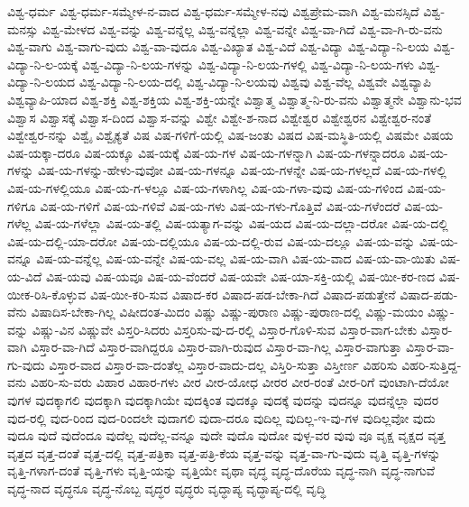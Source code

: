 {ವಿಶ್ವ-ಧರ್ಮ
ವಿಶ್ವ-ಧರ್ಮ-ಸಮ್ಮೇಳ-ನ-ವಾದ
ವಿಶ್ವ-ಧರ್ಮ-ಸಮ್ಮೇಳ-ನವು
ವಿಶ್ವಪ್ರೇಮ-ವಾಗಿ
ವಿಶ್ವ-ಮನಸ್ಸಿದೆ
ವಿಶ್ವ-ಮನಸ್ಸು
ವಿಶ್ವ-ಮೇಳದ
ವಿಶ್ವ-ವನ್ನು
ವಿಶ್ವ-ವನ್ನೆಲ್ಲ
ವಿಶ್ವ-ವನ್ನೆಲ್ಲಾ
ವಿಶ್ವ-ವನ್ನೇ
ವಿಶ್ವ-ವಾ-ಗಿದೆ
ವಿಶ್ವ-ವಾ-ಗಿ-ರು-ವನು
ವಿಶ್ವ-ವಾಗು
ವಿಶ್ವ-ವಾಗು-ವುದು
ವಿಶ್ವ-ವಾ-ವುದೂ
ವಿಶ್ವ-ವಿಖ್ಯಾತ
ವಿಶ್ವ-ವಿದೆ
ವಿಶ್ವ-ವಿದ್ಯಾ
ವಿಶ್ವ-ವಿದ್ಯಾ-ನಿ-ಲಯ
ವಿಶ್ವ-ವಿದ್ಯಾ-ನಿ-ಲ-ಯಕ್ಕೆ
ವಿಶ್ವ-ವಿದ್ಯಾ-ನಿ-ಲಯ-ಗಳನ್ನು
ವಿಶ್ವ-ವಿದ್ಯಾ-ನಿ-ಲಯ-ಗಳಲ್ಲಿ
ವಿಶ್ವ-ವಿದ್ಯಾ-ನಿ-ಲಯ-ಗಳು
ವಿಶ್ವ-ವಿದ್ಯಾ-ನಿ-ಲಯದ
ವಿಶ್ವ-ವಿದ್ಯಾ-ನಿ-ಲಯ-ದಲ್ಲಿ
ವಿಶ್ವ-ವಿದ್ಯಾ-ನಿ-ಲಯವು
ವಿಶ್ವವು
ವಿಶ್ವ-ವೆಲ್ಲ
ವಿಶ್ವವೇ
ವಿಶ್ವವ್ಯಾಪಿ
ವಿಶ್ವವ್ಯಾಪಿ-ಯಾದ
ವಿಶ್ವ-ಶಕ್ತಿ
ವಿಶ್ವ-ಶಕ್ತಿಯ
ವಿಶ್ವ-ಶಕ್ತಿ-ಯನ್ನೇ
ವಿಶ್ವಾತ್ಮ
ವಿಶ್ವಾತ್ಮ-ನಿ-ರು-ವನು
ವಿಶ್ವಾತ್ಮನೇ
ವಿಶ್ವಾನು-ಭವ
ವಿಶ್ವಾಸ
ವಿಶ್ವಾಸಕ್ಕೆ
ವಿಶ್ವಾಸ-ದಿಂದ
ವಿಶ್ವಾಸ-ವನ್ನು
ವಿಶ್ವೇ
ವಿಶ್ವೇ-ಶ-ನಾದ
ವಿಶ್ವೇಶ್ವರ
ವಿಶ್ವೇಶ್ವರನ
ವಿಶ್ವೇಶ್ವರ-ನಂತೆ
ವಿಶ್ವೇಶ್ವರ-ನನ್ನು
ವಿಶ್ವೈ
ವಿಶ್ವೈಕ್ಯತೆ
ವಿಷ
ವಿಷ-ಗಳಿಗೆ-ಯಲ್ಲಿ
ವಿಷ-ಜಂತು
ವಿಷದ
ವಿಷ-ಮಸ್ಥಿತಿ-ಯಲ್ಲಿ
ವಿಷಮೇ
ವಿಷಯ
ವಿಷ-ಯಕ್ಕಾ-ದರೂ
ವಿಷ-ಯಕ್ಕೂ
ವಿಷ-ಯಕ್ಕೆ
ವಿಷ-ಯ-ಗಳ
ವಿಷ-ಯ-ಗಳನ್ನಾಗಿ
ವಿಷ-ಯ-ಗಳನ್ನಾದರೂ
ವಿಷ-ಯ-ಗಳನ್ನು
ವಿಷ-ಯ-ಗಳನ್ನು-ಹೇಳು-ವುವೋ
ವಿಷ-ಯ-ಗಳನ್ನೂ
ವಿಷ-ಯ-ಗಳನ್ನೇ
ವಿಷ-ಯ-ಗಳಲ್ಲದೆ
ವಿಷ-ಯ-ಗಳಲ್ಲಿ
ವಿಷ-ಯ-ಗಳಲ್ಲಿಯೂ
ವಿಷ-ಯ-ಗ-ಳಲ್ಲೂ
ವಿಷ-ಯ-ಗಳಾಗಿಲ್ಲ
ವಿಷ-ಯ-ಗಳಾ-ವುವು
ವಿಷ-ಯ-ಗಳಿಂದ
ವಿಷ-ಯ-ಗಳಿಗೂ
ವಿಷ-ಯ-ಗಳಿಗೆ
ವಿಷ-ಯ-ಗಳಿವೆ
ವಿಷ-ಯ-ಗಳು
ವಿಷ-ಯ-ಗಳು-ಗೊತ್ತಿವೆ
ವಿಷ-ಯ-ಗಳೆಂದರೆ
ವಿಷ-ಯ-ಗಳೆಲ್ಲ
ವಿಷ-ಯ-ಗಳೆಲ್ಲಾ
ವಿಷ-ಯ-ತಲ್ಲಿ
ವಿಷ-ಯತ್ಯಾಗ-ವನ್ನು
ವಿಷ-ಯದ
ವಿಷ-ಯ-ದಲ್ಲಾ-ದರೋ
ವಿಷ-ಯ-ದಲ್ಲಿ
ವಿಷ-ಯ-ದಲ್ಲಿ-ಯಾ-ದರೋ
ವಿಷ-ಯ-ದಲ್ಲಿಯೂ
ವಿಷ-ಯ-ದಲ್ಲಿ-ರುವ
ವಿಷ-ಯ-ದಲ್ಲೂ
ವಿಷ-ಯ-ವನ್ನು
ವಿಷ-ಯ-ವನ್ನೂ
ವಿಷ-ಯ-ವನ್ನೆಲ್ಲ
ವಿಷ-ಯ-ವನ್ನೇ
ವಿಷ-ಯ-ವಲ್ಲ
ವಿಷ-ಯ-ವಾಗಿ
ವಿಷ-ಯ-ವಾದ
ವಿಷ-ಯ-ವಾ-ಯಿತು
ವಿಷ-ಯ-ವಿದೆ
ವಿಷ-ಯವು
ವಿಷ-ಯವೂ
ವಿಷ-ಯ-ವೆಂದರೆ
ವಿಷ-ಯವೇ
ವಿಷ-ಯಾ-ಸಕ್ತಿ-ಯಲ್ಲಿ
ವಿಷ-ಯೀ-ಕರ-ಣದ
ವಿಷ-ಯೀಕ-ರಿಸಿ-ಕೊಳ್ಳುವ
ವಿಷ-ಯೀ-ಕರಿ-ಸುವ
ವಿಷಾದ-ಕರ
ವಿಷಾದ-ಪಡ-ಬೇಕಾ-ಗಿದೆ
ವಿಷಾದ-ಪಡುತ್ತೇನೆ
ವಿಷಾದ-ಪಡು-ವೆನು
ವಿಷಾದಿಸ-ಬೇಕಾ-ಗಿಲ್ಲ
ವಿಷೀದಂತ-ಮಿದಂ
ವಿಷ್ಣು
ವಿಷ್ಣು-ಪುರಾಣ
ವಿಷ್ಣು-ಪುರಾಣ-ದಲ್ಲಿ
ವಿಷ್ಣು-ಮಯಂ
ವಿಷ್ಣು-ವನ್ನು
ವಿಷ್ಣು-ವಿನ
ವಿಷ್ಣುವೇ
ವಿಸ್ತರಿ-ಸಿದರು
ವಿಸ್ತರಿಸು-ವು-ದ-ರಲ್ಲಿ
ವಿಸ್ತಾರ-ಗೊಳಿ-ಸುವ
ವಿಸ್ತಾರ-ವಾಗ-ಬೇಕು
ವಿಸ್ತಾರ-ವಾಗಿ
ವಿಸ್ತಾರ-ವಾ-ಗಿದೆ
ವಿಸ್ತಾರ-ವಾಗಿದ್ದರೂ
ವಿಸ್ತಾರ-ವಾಗಿ-ರುವುದ
ವಿಸ್ತಾರ-ವಾ-ಗಿಲ್ಲ
ವಿಸ್ತಾರ-ವಾಗುತ್ತಾ
ವಿಸ್ತಾರ-ವಾ-ಗು-ವುದು
ವಿಸ್ತಾರ-ವಾದ
ವಿಸ್ತಾರ-ವಾ-ದಂತೆಲ್ಲ
ವಿಸ್ತಾರ-ವಾದು-ದಲ್ಲ
ವಿಸ್ತಿರಿ-ಸುತ್ತಾ
ವಿಸ್ತೀರ್ಣ
ವಿಹರಿಸು
ವಿಹರಿ-ಸುತ್ತಿದ್ದ-ವನು
ವಿಹರಿ-ಸು-ವರು
ವಿಹಾರ
ವಿಹಾರ-ಗಳು
ವೀರ
ವೀರ-ಯೋಧ
ವೀರರ
ವೀರ-ರಂತೆ
ವೀರ-ರಿಗೆ
ವುಂಟಾಗಿ-ದೆಯೋ
ವುಗಳ
ವುದಕ್ಕಾಗಲಿ
ವುದಕ್ಕಾಗಿ
ವುದಕ್ಕಾಗಿಯೇ
ವುದಕ್ಕಿಂತ
ವುದಕ್ಕೂ
ವುದಕ್ಕೆ
ವುದನ್ನು
ವುದನ್ನೂ
ವುದನ್ನೆಲ್ಲಾ
ವುದರ
ವುದ-ರಲ್ಲಿ
ವುದ-ರಿಂದ
ವುದ-ರಿಂದಲೇ
ವುದಾಗಲಿ
ವುದಾ-ದರೂ
ವುದಿಲ್ಲ
ವುದಿಲ್ಲ-ಇ-ವು-ಗಳ
ವುದಿಲ್ಲವೋ
ವುದು
ವುದೂ
ವುದೆ
ವುದೆಂದೂ
ವುದೆಲ್ಲ
ವುದೆಲ್ಲ-ವನ್ನೂ
ವುದೇ
ವುದೊ
ವುದೋ
ವುಳ್ಳ-ವರ
ವುವು
ವೂ
ವೃಕ್ಷ
ವೃಕ್ಷದ
ವೃತ್ತ
ವೃತ್ತದ
ವೃತ್ತ-ದಂತೆ
ವೃತ್ತ-ದಲ್ಲಿ
ವೃತ್ತ-ಪತ್ರಿಕಾ
ವೃತ್ತ-ಪತ್ರಿ-ಕೆಯ
ವೃತ್ತ-ವನ್ನು
ವೃತ್ತ-ವಾ-ಗು-ವುದು
ವೃತ್ತಿ
ವೃತ್ತಿ-ಗಳನ್ನು
ವೃತ್ತಿ-ಗಳಾಗ-ದಂತೆ
ವೃತ್ತಿ-ಗಳು
ವೃತ್ತಿ-ಯನ್ನು
ವೃತ್ತಿಯೇ
ವೃಥಾ
ವೃದ್ಧ
ವೃದ್ಧ-ದೊರೆಯ
ವೃದ್ಧ-ನಾಗಿ
ವೃದ್ಧ-ನಾಗುವೆ
ವೃದ್ಧ-ನಾದ
ವೃದ್ಧನೂ
ವೃದ್ಧ-ನೊಬ್ಬ
ವೃದ್ಧರ
ವೃದ್ಧರು
ವೃದ್ಧಾಪ್ಯ
ವೃದ್ಧಾಪ್ಯ-ದಲ್ಲಿ
ವೃದ್ಧಿ
}
